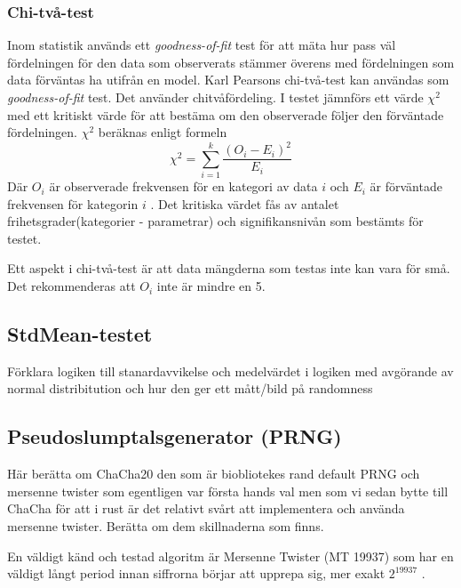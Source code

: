 \documentclass[swedish,a4paper]{article}
\begin{document}
\subsubsection{Chi-två-test}
\label{sec:chi_square}
Inom statistik används ett \textit{goodness-of-fit} test för att mäta
hur pass väl fördelningen för den data som observerats stämmer överens
med fördelningen som data förväntas ha utifrån en model. Karl Pearsons
chi-två-test kan användas som \textit{goodness-of-fit} test. Det
använder chitvåfördeling. I testet jämnförs ett värde $\chi^2$ med ett
kritiskt värde för att bestäma om den observerade följer den förväntade
fördelningen. $\chi^2$ beräknas enligt formeln
$$\chi^2 = \sum_{i=1}^k\frac{(O_i - E_i)^2}{E_i}$$
Där $O_i$ är observerade frekvensen för en kategori av data $i$ och $E_i$
är förväntade frekvensen för kategorin $i$ \parencite{nist}.
Det kritiska värdet fås av antalet frihetsgrader(kategorier - parametrar)
och signifikansnivån som bestämts för testet.

Ett aspekt i chi-två-test är att data mängderna som testas inte kan vara för små. Det rekommenderas att $O_i$ inte är mindre en 5.

\subsection{StdMean-testet}
Förklara logiken till stanardavvikelse och medelvärdet
i logiken med avgörande av normal distribitution och hur den ger ett mått/bild på randomness

\subsection{Pseudoslumptalsgenerator (PRNG)}
Här berätta om ChaCha20 \parencite{chacha} den som är biobliotekes rand
\parencite{rand_crate} default PRNG och mersenne twister som egentligen var första
hands val
\parencite{mersenne_twister} men som vi sedan bytte till ChaCha för att i rust
är det relativt svårt att  implementera och använda mersenne twister. Berätta om
dem skillnaderna som finns.


En väldigt känd och testad algoritm är Mersenne Twister (MT 19937) som
har en väldigt långt period innan siffrorna börjar att upprepa sig, mer
exakt $2^{19937}$ \parencite{mersenne_twister}.
\end{document}

